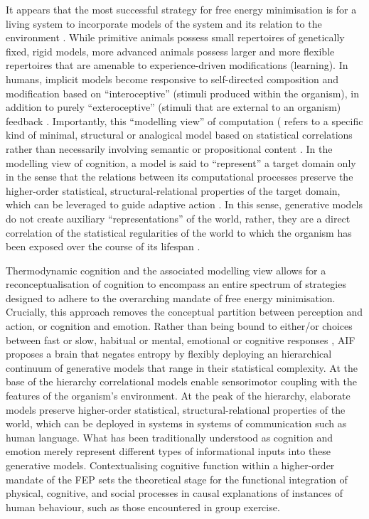 \begin{CJK}{UTF8}{gbsn}
It appears that the most successful strategy for free energy minimisation is for a living system to incorporate models of the system and its relation to the environment \citep{Conant1970}.  While primitive animals possess small repertoires of genetically fixed, rigid models, more advanced animals possess larger and more flexible repertoires that are amenable to experience-driven modifications (learning).  In humans, implicit models become responsive to self-directed composition and modification based on ``interoceptive'' (stimuli produced within the organism), in addition to purely ``exteroceptive'' (stimuli that are external to an organism) feedback \citep{Yufik1998,FeldmanBarrett2015}.  Importantly, this ``modelling view'' of computation (\citep{Grush 2001;Chirimuuta2014} refers to a specific kind of minimal, structural or analogical model based on statistical correlations rather than necessarily involving semantic or propositional content \citep[also known as ``generative models''][]{Friston2001,OBrien2004,Huto2015}.  In the modelling view of cognition, a model is said to ``represent'' a target domain only in the sense that the relations between its computational processes preserve the higher-order statistical, structural-relational properties of the target domain, which can be leveraged to guide adaptive action \citep[see][8]{Ramstead2016}.  In this sense, generative models do not create auxiliary ``representations'' of the world, rather, they are a direct correlation of the statistical regularities of the world to which the organism has been exposed over the course of its lifespan \citep{Ramstead2017}.

Thermodynamic cognition and the associated modelling view allows for a reconceptualisation of cognition to encompass an entire spectrum of strategies designed to adhere to the overarching mandate of free energy minimisation. Crucially, this approach removes the conceptual partition between
perception and action, or cognition and emotion.  Rather than being bound to either/or choices between fast or slow, habitual or mental, emotional or cognitive responses \citep[cf.][]{Kahneman2011}, AIF proposes a brain that negates entropy by flexibly deploying an hierarchical continuum of generative models that range in their statistical complexity. At the base of the hierarchy correlational models enable sensorimotor coupling with the features of the organism's environment.  At the peak of the hierarchy, elaborate models preserve higher-order statistical, structural-relational properties of the world, which can be deployed in systems in systems of communication such as human language.  What has been traditionally understood as cognition and emotion merely represent different types of informational inputs into these generative models.  Contextualising cognitive function within a higher-order mandate of the FEP sets the theoretical stage for the functional integration of physical, cognitive, and social processes in causal explanations of instances of human behaviour, such as those encountered in group exercise.


\end{CJK}
